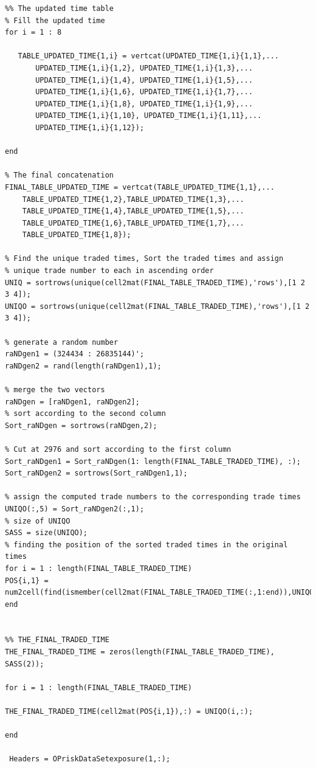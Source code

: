 \documentclass{DissertateUSU}
\begin{document}
\begin{verbatim}
%% The updated time table
% Fill the updated time
for i = 1 : 8
    
   TABLE_UPDATED_TIME{1,i} = vertcat(UPDATED_TIME{1,i}{1,1},...
       UPDATED_TIME{1,i}{1,2}, UPDATED_TIME{1,i}{1,3},...
       UPDATED_TIME{1,i}{1,4}, UPDATED_TIME{1,i}{1,5},...
       UPDATED_TIME{1,i}{1,6}, UPDATED_TIME{1,i}{1,7},...
       UPDATED_TIME{1,i}{1,8}, UPDATED_TIME{1,i}{1,9},...
       UPDATED_TIME{1,i}{1,10}, UPDATED_TIME{1,i}{1,11},...
       UPDATED_TIME{1,i}{1,12});
    
end

% The final concatenation
FINAL_TABLE_UPDATED_TIME = vertcat(TABLE_UPDATED_TIME{1,1},...
    TABLE_UPDATED_TIME{1,2},TABLE_UPDATED_TIME{1,3},...
    TABLE_UPDATED_TIME{1,4},TABLE_UPDATED_TIME{1,5},...
    TABLE_UPDATED_TIME{1,6},TABLE_UPDATED_TIME{1,7},...
    TABLE_UPDATED_TIME{1,8});

% Find the unique traded times, Sort the traded times and assign
% unique trade number to each in ascending order
UNIQ = sortrows(unique(cell2mat(FINAL_TABLE_TRADED_TIME),'rows'),[1 2 3 4]);
UNIQO = sortrows(unique(cell2mat(FINAL_TABLE_TRADED_TIME),'rows'),[1 2 3 4]);

% generate a random number
raNDgen1 = (324434 : 26835144)';
raNDgen2 = rand(length(raNDgen1),1);

% merge the two vectors
raNDgen = [raNDgen1, raNDgen2];
% sort according to the second column
Sort_raNDgen = sortrows(raNDgen,2);

% Cut at 2976 and sort according to the first column
Sort_raNDgen1 = Sort_raNDgen(1: length(FINAL_TABLE_TRADED_TIME), :);
Sort_raNDgen2 = sortrows(Sort_raNDgen1,1);

% assign the computed trade numbers to the corresponding trade times
UNIQO(:,5) = Sort_raNDgen2(:,1);
% size of UNIQO
SASS = size(UNIQO);
% finding the position of the sorted traded times in the original times
for i = 1 : length(FINAL_TABLE_TRADED_TIME)
POS{i,1} = num2cell(find(ismember(cell2mat(FINAL_TABLE_TRADED_TIME(:,1:end)),UNIQO(i,1:4),'rows')~=0));
end


%% THE_FINAL_TRADED_TIME
THE_FINAL_TRADED_TIME = zeros(length(FINAL_TABLE_TRADED_TIME), SASS(2));

for i = 1 : length(FINAL_TABLE_TRADED_TIME)
    
THE_FINAL_TRADED_TIME(cell2mat(POS{i,1}),:) = UNIQO(i,:);   
       
end

 Headers = OPriskDataSetexposure(1,:);


\end{verbatim}
\end{document}
